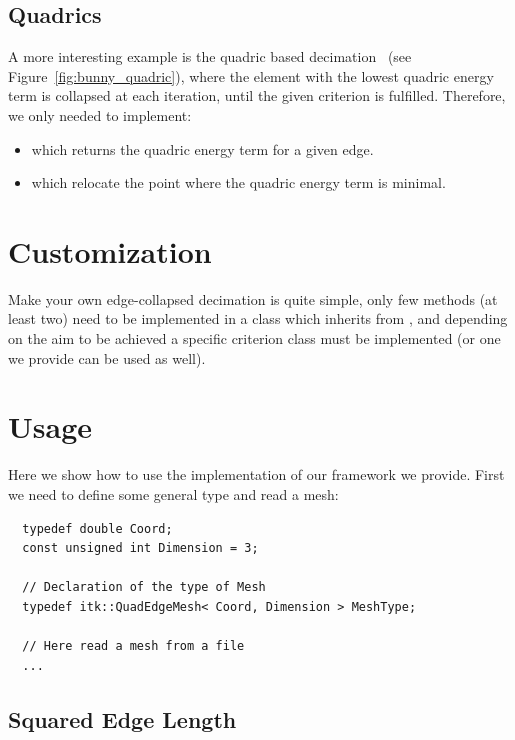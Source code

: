 \documentclass{InsightArticle}
\theoremstyle{plain}
\begin{document}
\subsection{Quadrics}
A more interesting example is the quadric based decimation~\cite{Garland97:QEM} (see Figure~\ref{fig:bunny_quadric}), where the element with the lowest quadric energy term is collapsed at each iteration, until the given criterion is fulfilled. Therefore, we only needed to implement:
\begin{itemize}
 \item {} which returns the quadric energy term for a given edge.
 \item {} which relocate the point where the quadric energy term is minimal.
\end{itemize}

\section{Customization}
Make your own edge-collapsed decimation is quite simple, only few methods (at least two) need to be implemented in a class which inherits from , and depending on the aim to be achieved a specific criterion class must be implemented (or one we provide can be used as well).

\section{Usage}
Here we show how to use the implementation of our framework we provide. First we need to define some general type and read a mesh:

\begin{verbatim}
  typedef double Coord;
  const unsigned int Dimension = 3;

  // Declaration of the type of Mesh
  typedef itk::QuadEdgeMesh< Coord, Dimension > MeshType;

  // Here read a mesh from a file
  ...
\end{verbatim}

\subsection{Squared Edge Length}
\end{document}
